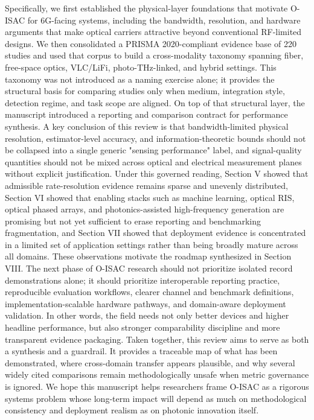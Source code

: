 {}Specifically, we first established the physical-layer foundations that motivate O-ISAC for 6G-facing systems, including the bandwidth, resolution, and hardware arguments that make optical carriers attractive beyond conventional RF-limited designs. We then consolidated a PRISMA 2020-compliant evidence base of 220 studies and used that corpus to build a cross-modality taxonomy spanning fiber, free-space optics, VLC/LiFi, photo-THz-linked, and hybrid settings. This taxonomy was not introduced as a naming exercise alone; it provides the structural basis for comparing studies only when medium, integration style, detection regime, and task scope are aligned.\markdownRendererParagraphSeparator
{}On top of that structural layer, the manuscript introduced a reporting and comparison contract for performance synthesis. A key conclusion of this review is that bandwidth-limited physical resolution, estimator-level accuracy, and information-theoretic bounds should not be collapsed into a single generic "sensing performance" label, and signal-quality quantities should not be mixed across optical and electrical measurement planes without explicit justification. Under this governed reading, Section V showed that admissible rate-resolution evidence remains sparse and unevenly distributed, Section VI showed that enabling stacks such as machine learning, optical RIS, optical phased arrays, and photonics-assisted high-frequency generation are promising but not yet sufficient to erase reporting and benchmarking fragmentation, and Section VII showed that deployment evidence is concentrated in a limited set of application settings rather than being broadly mature across all domains.\markdownRendererParagraphSeparator
{}These observations motivate the roadmap synthesized in Section VIII. The next phase of O-ISAC research should not prioritize isolated record demonstrations alone; it should prioritize interoperable reporting practice, reproducible evaluation workflows, clearer channel and benchmark definitions, implementation-scalable hardware pathways, and domain-aware deployment validation. In other words, the field needs not only better devices and higher headline performance, but also stronger comparability discipline and more transparent evidence packaging.\markdownRendererParagraphSeparator
{}Taken together, this review aims to serve as both a synthesis and a guardrail. It provides a traceable map of what has been demonstrated, where cross-domain transfer appears plausible, and why several widely cited comparisons remain methodologically unsafe when metric governance is ignored. We hope this manuscript helps researchers frame O-ISAC as a rigorous systems problem whose long-term impact will depend as much on methodological consistency and deployment realism as on photonic innovation itself.
\markdownRendererSectionEnd \markdownRendererDocumentEnd